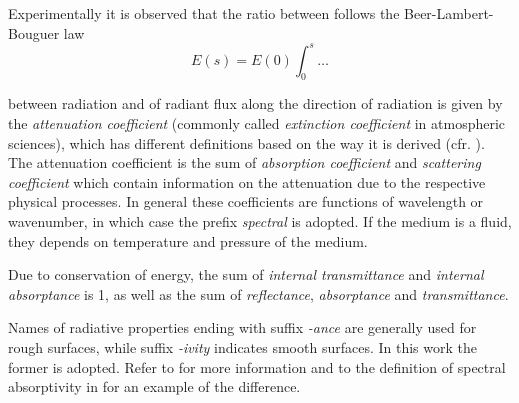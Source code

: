 \documentclass[a4paper,10pt,twocolumn,\classoptions]{article}
\begin{document}
Experimentally it is observed that the ratio between follows the Beer-Lambert-Bouguer law
\begin{equation}
  \label{eq:extinction_law}
  E(s) = E(0) \int_0^s \dots
\end{equation}

between radiation and  of radiant flux along the direction of radiation is given by the \emph{attenuation coefficient} (commonly called \emph{extinction coefficient} in atmospheric sciences), which has different definitions based on the way it is derived (cfr. \cite[44]{Catling}). The attenuation coefficient is the sum of \emph{absorption coefficient} and \emph{scattering coefficient} which contain information on the attenuation due to the respective physical processes.
In general these coefficients are functions of wavelength or wavenumber, in which case the prefix \emph{spectral} is adopted. If the medium is a fluid, they depends on temperature and pressure of the medium.

Due to conservation of energy, the sum of \emph{internal transmittance} and \emph{internal absorptance} is 1, as well as the sum of \emph{reflectance}, \emph{absorptance} and \emph{transmittance}.

Names of radiative properties ending with suffix \emph{-ance} are generally used for rough surfaces, while suffix \emph{-ivity} indicates smooth surfaces. In this work the former is adopted. Refer to \cite[20]{Modest} for more information and to the definition of spectral absorptivity in \cite{CIE} for an example of the difference.
\end{document}
